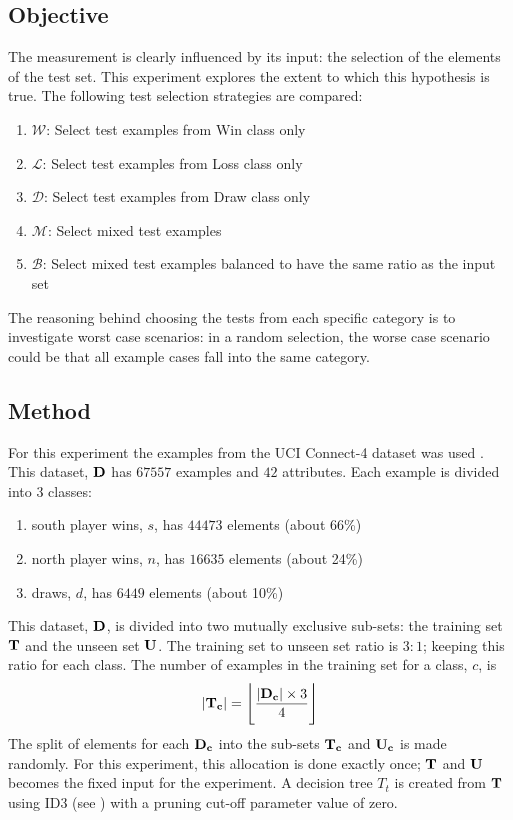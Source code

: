 \subsection{Objective}
The  measurement is clearly influenced by its input: the selection of the elements of the test set.  This experiment explores the extent to which this hypothesis is true.
The following test selection strategies are compared:
\begin{enumerate}
	\item $\mathcal W$: Select test examples from Win class only
	\item $\mathcal L$: Select test examples from Loss class only
	\item $\mathcal D$: Select test examples from Draw class only
	\item $\mathcal M$: Select mixed test examples
	\item $\mathcal B$: Select mixed test examples balanced to have the same ratio as the input set %
\end{enumerate} 
The reasoning behind choosing the tests from each specific category is to investigate worst case scenarios: in a random selection, the worse case scenario could be that all example cases fall into the same category. 

\subsection{Method}
For this experiment the examples from the UCI Connect-4 dataset was used \cite{icu:data}. This dataset, $\myset D$ has $67557$ examples and $42$ attributes.  Each example is divided into $3$ classes:
\begin{enumerate}
	\item south player wins, $s$, has $44473$ elements (about 66\%)
	\item north player wins, $n$, has $16635$ elements (about 24\%)
	\item draws, $d$, has $6449$ elements (about 10\%)
\end{enumerate}
This dataset, $\myset D$, is divided into two mutually exclusive sub-sets: the training set $\myset T$ and the unseen set $\myset U$. The training set to unseen set ratio is $3:1$; keeping this ratio for each class. The number of examples in the training set for a class, $c$, is \[ |\myset{T_c}| = \floor[\Bigg]{\frac{|\myset{D_c}| \times 3} {4}}\] 
The split of elements for each $\myset{D_c}$ into the sub-sets $\myset{T_c}$ and $\myset{U_c}$ is made randomly. For this experiment, this allocation is done exactly once; $\myset T$ and $\myset U$ becomes the fixed input for the experiment. A decision tree $T_t$ is created from $\myset T$ using ID3 (see ) with a pruning cut-off parameter value of zero.   


